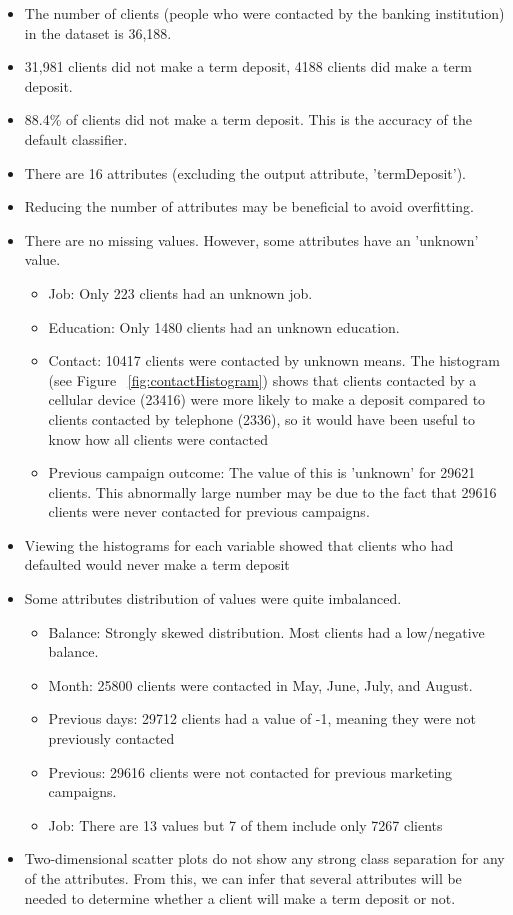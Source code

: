 \documentclass[a4paper,11pt]{article}
\begin{document}
\begin{itemize}
  \item{The number of clients (people who were contacted by the banking institution) in
  the dataset is 36,188.}
  \item{31,981 clients did not make a term deposit, 4188 clients did make a term deposit.}
  \item{88.4\% of clients did not make a term deposit. This is the accuracy of the default classifier.} 
  \item{There are 16 attributes (excluding the output attribute, 'termDeposit').}
  \item{Reducing the number of attributes may be beneficial to avoid overfitting.}
  \item{There are no missing values. However, some attributes have an 'unknown' value.}
  \begin{itemize}
    \item{Job: Only 223 clients had an unknown job.}
    \item{Education: Only 1480 clients had an unknown education.}
    \item{Contact: 10417 clients were contacted by unknown means. The histogram (see Figure ~\ref{fig:contactHistogram}) shows
    that clients contacted by a cellular device (23416) were more likely to make a deposit
    compared to clients contacted by telephone (2336), so it would have been useful to know how
    all clients were contacted}
    \item{Previous campaign outcome: The value of this is 'unknown' for 29621 clients. This abnormally
    large number may be due to the fact that 29616 clients were never contacted for previous campaigns.}
  \end{itemize}
  \item{Viewing the histograms for each variable showed that clients who had defaulted
  would never make a term deposit}
  \item{Some attributes distribution of values were quite imbalanced.}
  \begin{itemize}
      \item{Balance: Strongly skewed distribution. Most clients had a low/negative balance.}
      \item{Month: 25800 clients were contacted in May, June, July, and August.}
      \item{Previous days: 29712 clients had a value of -1, meaning they were not previously contacted}
      \item{Previous: 29616 clients were not contacted for previous marketing campaigns.}
      \item{Job: There are 13 values but 7 of them include only 7267 clients}
  \end{itemize}
  \item{Two-dimensional scatter plots do not show any strong class separation for any of the attributes.
  From this, we can infer that several attributes will be needed to determine whether a client will
  make a term deposit or not.}
\end{itemize}
\end{document}
